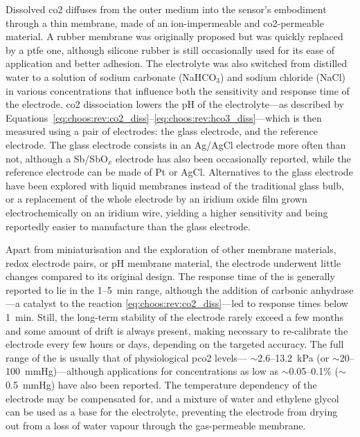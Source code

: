 Dissolved \gls{co2} diffuses from the outer medium into the sensor's embodiment through a thin membrane, made of an ion-impermeable and \gls{co2}-permeable material. A rubber membrane was originally proposed but was quickly replaced by a \gls{ptfe} one\cite{severinghaus1986_3, severinghaus1958}, although silicone rubber is still occasionally used for its ease of application and better adhesion\cite{shin2000}. The electrolyte was also switched from distilled water to a solution of sodium carbonate (NaHCO$_3$) and sodium chloride (NaCl) in various concentrations that influence both the sensitivity and response time of the electrode\cite{jensen1979}. \gls{co2} dissociation lowers the pH of the electrolyte---as described by Equations~\ref{eq:choos:rev:co2_diss}--\ref{eq:choos:rev:hco3_diss}---which is then measured using a pair of electrodes: the glass electrode, and the reference electrode. The glass electrode consists in an Ag/AgCl electrode more often than not, although a Sb/SbO$_x$ electrode has also been occasionally reported\cite{beran1976}, while the reference electrode can be made of Pt\cite{severinghaus1958, severinghaus1981} or AgCl\cite{beran1976}. Alternatives to the glass electrode have been explored with liquid membranes instead of the traditional glass bulb\cite{zhao1997}, or a replacement of the whole electrode by an iridium oxide film grown electrochemically on an iridium wire, yielding a higher sensitivity and being reportedly easier to manufacture than the glass electrode\cite{suzuki1999, beyenal2004}.

Apart from miniaturisation and the exploration of other membrane materials, redox electrode pairs, or pH membrane material, the electrode underwent little changes compared to its original design. The response time of the \ssel{} is generally reported to lie in the 1--5~min range, although the addition of carbonic anhydrase---a catalyst to the reaction \ref{eq:choos:rev:co2_diss}---led to response times below 1~min\cite{donaldson1979, shin2000}. Still, the long-term stability of the electrode rarely exceed a few months and some amount of drift is always present, making necessary to re-calibrate the electrode every few hours or days, depending on the targeted accuracy\cite{zhao1997, mcguire2002}. The full range of the \ssel{} is usually that of physiological \gls{pco2} levels---\ie{} $\sim$2.6--13.2~kPa (or $\sim$20--100~mmHg)\cite{conway2018}---although applications for concentrations as low as $\sim$0.05--0.1\% ($\sim$0.5~mmHg) have also been reported\cite{cai1993, zhao1997}. The temperature dependency of the electrode may be compensated for, and a mixture of water and ethylene glycol can be used as a base for the electrolyte, preventing the electrode from drying out from a loss of water vapour through the gas-permeable membrane\cite{whitehead1980}.

